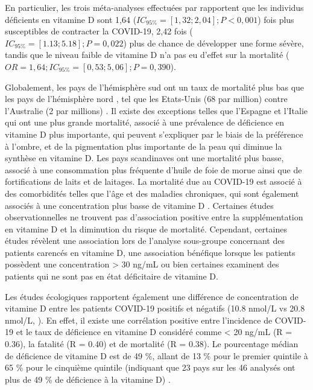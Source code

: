 \documentclass[
  a4paper,
  DIV=11,
  numbers=noendperiod,
  listof=totoc]{scrreprt}
\begin{document}
En particulier, les trois méta-analyses effectuées par
\textcite{Kaya.2021} rapportent que les individus déficients en vitamine
D sont 1,64 (\(IC_{95\%} = [1,32 ; 2,04] ; P < 0,001\)) fois plus
susceptibles de contracter la COVID-19, 2,42 fois
(\(IC_{95\%} = [1.13; 5.18] ; P = 0,022\)) plus de chance de développer
une forme sévère, tandis que le niveau faible de vitamine D n'a pas eu
d'effet sur la mortalité
(\(OR = 1,64; IC_{95\%} = [0,53; 5,06]; P = 0,390\)).

Globalement, les pays de l'hémisphère sud ont un taux de mortalité plus
bas que les pays de l'hémisphère nord \autocite{Contreras-Bolívar.2023},
tel que les Etats-Unis (68 par million) contre l'Australie (2 par
millions) \autocite{Bishop.2021}. Il existe des exceptions telles que
l'Espagne et l'Italie qui ont une plus grande mortalité, associé à une
prévalence de déficience en vitamine D plus importante, qui peuvent
s'expliquer par le biais de la préférence à l'ombre, et de la
pigmentation plus importante de la peau qui diminue la synthèse en
vitamine D. Les pays scandinaves ont une mortalité plus basse, associé à
une consommation plus fréquente d'huile de foie de morue ainsi que de
fortifications de laits et de laitages. La mortalité due au COVID-19 est
associé à des comorbidités telles que l'âge et des maladies chroniques,
qui sont également associés à une concentration plus basse de vitamine D
\autocite{Bishop.2021}. Certaines études observationnelles ne trouvent
pas d'association positive entre la supplémentation en vitamine D et la
diminution du risque de mortalité. Cependant, certaines études révèlent
une association lors de l'analyse sous-groupe concernant des patients
carencés en vitamine D, une association bénéfique lorsque les patients
possèdent une concentration \textgreater{} 30 ng/mL
\autocite{Oristrell.2022} ou bien certaines examinent des patients qui
ne sont pas en état déficitaire de vitamine D.

Les études écologiques rapportent également une différence de
concentration de vitamine D entre les patients COVID-19 positifs et
négatifs (10.8 nmol/L vs 20.8 nmol/L, \textcite{Baktash.2021}). En
effet, il existe une corrélation positive entre l'incidence de COVID-19
et le taux de déficience en vitamine D considéré comme \textless{} 20
ng/mL (R = 0.36), la fatalité (R = 0.40) et de mortalité (R = 0.38). Le
pourcentage médian de déficience de vitamine D est de 49 \%, allant de
13 \% pour le premier quintile à 65 \% pour le cinquième quintile
(indiquant que 23 pays sur les 46 analysés ont plus de 49 \% de
déficience à la vitamine D) \autocite{Mariani.2021}.
\end{document}
